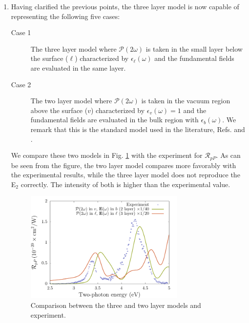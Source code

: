 \documentclass{article}
\begin{document}
\begin{enumerate}
\item Having clarified the previous points, the three layer model is now capable
of representing the following five cases:
\begin{description}
\item[Case 1] The three layer model where $\mathcal{P}(2\omega)$ is taken in the
small layer below the surface ($\ell$) characterized by
$\epsilon_{\ell}(\omega)$ and the fundamental fields are evaluated in the same
layer.
\item[Case 2] The two layer model where $\mathcal{P}(2\omega)$ is taken in the
vacuum region above the surface ($v$) characterized by $\epsilon_{v}(\omega) =
1$ and the fundamental fields are evaluated in the bulk region with
$\epsilon_{b}(\omega)$. We remark that this is the standard model used in the
literature, Refs. \cite{sipePRB87} and \cite{mizrahiJOSA88}.
\end{description}
We compare these two models in Fig. \ref{3layervs2layer} with the experiment for
$\mathcal{R}_{pP}$. As can be seen from the figure, the two layer model compares
more favorably with the experimental results, while the three layer model does
not reproduce the E$_{2}$ correctly. The intensity of both is higher than the
experimental value.

\begin{figure}[t]
\centering
\includegraphics[width=0.75\textwidth]{figures/rpp-3vs2layer}
\caption{Comparison between the three and two layer models and experiment.}
\label{3layervs2layer}
\end{figure}


\end{enumerate}
\end{document}
